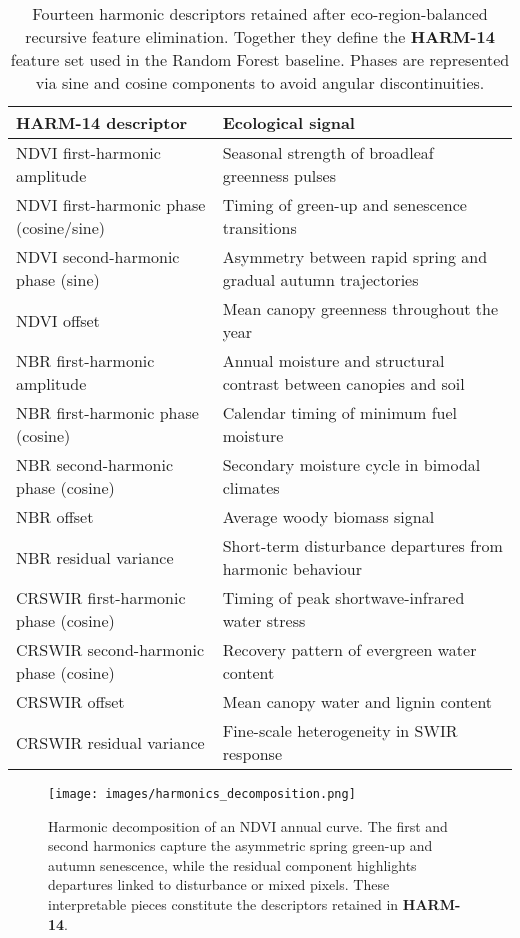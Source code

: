 \documentclass[utf8]{FrontiersinHarvard}
\begin{document}
\begin{table}[H]
    \centering
    \small
    \begin{tabular}{lp{}}
        \hline
        \textbf{HARM-14 descriptor} & \textbf{Ecological signal} \\
        \hline
        NDVI first-harmonic amplitude & Seasonal strength of broadleaf greenness pulses \\
        NDVI first-harmonic phase (cosine/sine) & Timing of green-up and senescence transitions \\
        NDVI second-harmonic phase (sine) & Asymmetry between rapid spring and gradual autumn trajectories \\
        NDVI offset & Mean canopy greenness throughout the year \\
        NBR first-harmonic amplitude & Annual moisture and structural contrast between canopies and soil \\
        NBR first-harmonic phase (cosine) & Calendar timing of minimum fuel moisture \\
        NBR second-harmonic phase (cosine) & Secondary moisture cycle in bimodal climates \\
        NBR offset & Average woody biomass signal \\
        NBR residual variance & Short-term disturbance departures from harmonic behaviour \\
        CRSWIR first-harmonic phase (cosine) & Timing of peak shortwave-infrared water stress \\
        CRSWIR second-harmonic phase (cosine) & Recovery pattern of evergreen water content \\
        CRSWIR offset & Mean canopy water and lignin content \\
        CRSWIR residual variance & Fine-scale heterogeneity in SWIR response \\
        \hline
    \end{tabular}
    \caption{Fourteen harmonic descriptors retained after eco-region-balanced recursive feature elimination. Together they define the \textbf{HARM-14} feature set used in the Random Forest baseline. Phases are represented via sine and cosine components to avoid angular discontinuities.}
    \label{tab:harmonic14}
\end{table}

\begin{figure}[H]
    \centering
    \texttt{[image: images/harmonics\_decomposition.png]}
    \caption{Harmonic decomposition of an NDVI annual curve. The first and second harmonics capture the asymmetric spring green-up and autumn senescence, while the residual component highlights departures linked to disturbance or mixed pixels. These interpretable pieces constitute the descriptors retained in \textbf{HARM-14}.}
    \label{fig:harmonics_decomposition}
\end{figure}
\end{document}
